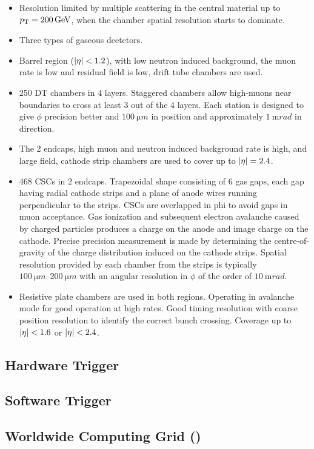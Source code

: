 \begin{itemize}
    \item Resolution limited by multiple scattering in the central material
        up to $p_{\text{T}}=\SI{200}{GeV}$, when the chamber spatial resolution starts
        to dominate.
    \item Three types of gaseous deetctors.
    \item Barrel region (${|\eta|<1.2}$), with low neutron induced background,
        the muon rate is low and residual field is low, drift tube chambers are
        used.
    \item 250 DT chambers in 4 layers. Staggered chambers allow high-\pt muons
        near boundaries to cross at least 3 out of the 4 layers. Each station is
        designed to give $\phi$ precision better and ${\SI{100}{\micro m}}$ in
        position and approximately ${\SI{1}{\milli rad}}$ in direction.
    \item The 2 endcaps, high muon and neutron induced background rate is high,
        and large field, cathode strip chambers are used to cover up to
        ${{|\eta|}=2.4}$.
    \item 468 CSCs in 2 endcaps. Trapezoidal shape consisting of 6 gas gaps,
        each gap having radial cathode strips and a plane of anode wires running
        perpendicular to the strips. CSCs are overlapped in phi to avoid gaps
        in muon acceptance. Gas ionization and subsequent electron avalanche
        caused by charged particles produces a charge on the anode and image
        charge on the cathode. Precise precision measurement is made by
        determining the centre-of-gravity of the charge distribution induced on
        the cathode strips. Spatial resolution provided by each chamber from the
        strips is typically ${\SIrange{100}{200}{\micro m}}$ with an angular
        resolution in $\phi$ of the order of ${\SI{10}{\milli rad}}$.
    \item Resistive plate chambers are used in both regions. Operating
        in avalanche mode for good operation at high rates. Good timing
        resolution with coarse position resolution to identify the correct
        bunch crossing. Coverage up to ${|\eta|<1.6}$ or ${|\eta|<2.4}$.
\end{itemize}

\subsection{Hardware Trigger}

\subsection{Software Trigger}

\subsection{Worldwide \LHC Computing Grid (\WLCG)}

